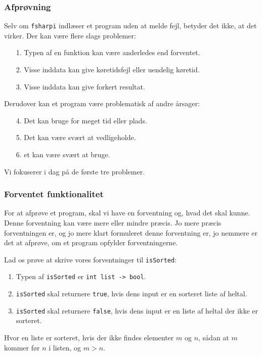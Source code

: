\documentclass{beamer}
\begin{document}
\begin{frame}
\frametitle{Afprøvning}

Selv om \texttt{fsharpi} indlæser et program uden at melde fejl,
betyder det ikke, at det virker.  Der kan være flere slags problemer:

\begin{itemize}
\item[1.] Typen af en funktion kan være anderledes end forventet.
\item[2.] Visse inddata kan give køretidsfejl eller uendelig køretid.
\item[3.] Visse inddata kan give forkert resultat.
\end{itemize}



Derudover kan et program være problematisk af andre årsager:

\begin{itemize}
\item[4.] Det kan bruge for meget tid eller plads.
\item[5.] Det kan være svært at vedligeholde.
\item[6.] et kan være svært at bruge.
\end{itemize}


Vi fokuserer i dag på de første tre problemer.

\end{frame}

\begin{frame}
\frametitle{Forventet funktionalitet}

For at afprøve et program, skal vi have en forventning og, hvad det
skal kunne.  Denne forventning kan være mere eller mindre præcis.  Jo
mere præcis forventningen er, og jo mere klart formuleret denne
forventning er, jo nemmere er det at afprøve, om et program opfylder
forventningerne.

Lad os prøve at skrive vores forventninger til \texttt{isSorted}:

\begin{enumerate}[~1.]
\item Typen af \texttt{isSorted} er \texttt{int list -> bool}.
\item \texttt{isSorted} skal returnere \texttt{true}, hvis dens input
  er en sorteret liste af heltal.
\item \texttt{isSorted} skal returnere \texttt{false}, hvis dens input
  er en liste af heltal der ikke er sorteret.
\end{enumerate}

Hvor en liste er sorteret, hvis der ikke findes elementer $m$ og $n$,
sådan at $m$ kommer før $n$ i listen, og $m>n$.

\end{frame}
\end{document}
